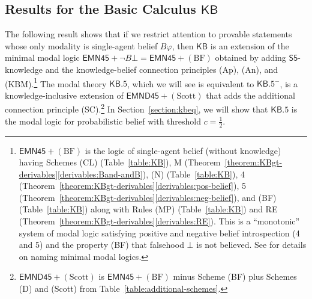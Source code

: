 \documentclass[12pt]{article}
\theoremstyle{definition}
\newcommand{\KB}{{\mathsf{KB}}}                 %
\newcommand{\KBeq}{{\mathsf{KB.5}}}             %
\begin{document}
\subsection{Results for the Basic Calculus $\KB$}

The following result shows that if we restrict attention to provable
statements whose only modality is single-agent belief $B\varphi$, then
$\KB$ is an extension of the minimal modal logic
$\mathsf{EMN45}+\lnot B\bot=\mathsf{EMN45}+(\text{BF})$ obtained by
adding $\mathsf{S5}$-knowledge and the knowledge-belief connection
principles (Ap), (An), and
(KBM).\footnote{$\mathsf{EMN45}+(\text{BF})$ is the logic of
  single-agent belief (without knowledge) having Schemes (CL)
  (Table~\ref{table:KB}), M
  (Theorem~\ref{theorem:KBgt-derivables}\eqref{derivables:Band-andB}),
  (N) (Table~\ref{table:KB}), 4
  (Theorem~\ref{theorem:KBgt-derivables}\eqref{derivables:pos-belief}),
  5
  (Theorem~\ref{theorem:KBgt-derivables}\eqref{derivables:neg-belief}),
  and (BF) (Table~\ref{table:KB}) along with Rules (MP)
  (Table~\ref{table:KB}) and RE
  (Theorem~\ref{theorem:KBgt-derivables}\eqref{derivables:RE}). This
  is a ``monotonic'' system of modal logic satisfying positive and
  negative belief introspection (4 and 5) and the property (BF) that
  falsehood $\bot$ is not believed. See \cite[Ch.~8]{Chellas:ml} for
  details on naming minimal modal logics.} The modal theory $\KBeq$,
which we will see is equivalent to $\KBeq^-$, is a knowledge-inclusive
extension of $\mathsf{EMND45}+(\text{Scott})$ that adds the additional
connection principle (SC).\footnote{$\mathsf{EMND45}+(\text{Scott})$
  is $\mathsf{EMN45}+(\text{BF})$ minus Scheme (BF) plus Schemes (D)
  and (Scott) from Table~\ref{table:additional-schemes}.}  In
Section~\ref{section:kbeq}, we will show that $\KBeq$ is the modal
logic for probabilistic belief with threshold $c=\frac 12$.
\end{document}
